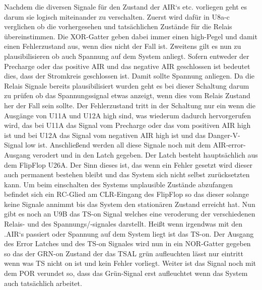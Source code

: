 Nachdem die diversen Signale für den Zustand der \ac{AIR}`s etc. vorliegen geht es darum sie logisch miteinander zu verschalten. Zuerst wird dafür in U8a-c verglichen ob die vorhergesehen und tatsächlichen Zustände für die Relais übereinstimmen. Die XOR-Gatter geben dabei immer einen high-Pegel und damit einen Fehlerzustand aus, wenn dies nicht der Fall ist. Zweitens gilt es nun zu plausibilisieren ob auch Spannung auf dem System anliegt. Sofern entweder der Precharge oder das positive \ac{AIR} und das negative \ac{AIR} geschlossen ist bedeutet dies, dass der Stromkreis geschlossen ist. Damit sollte Spannung anliegen. Da die Relais Signale bereits plausibilisiert wurden geht es bei dieser Schaltung darum zu prüfen ob das Spannungssignal etwas anzeigt, wenn dies vom Relais Zustand her der Fall sein sollte. Der Fehlerzustand tritt in der Schaltung nur ein wenn die Ausgänge von U11A und U12A high sind, was wiederum dadurch hervorgerufen wird, das bei U11A das Signal vom Precharge oder das vom positiven \ac{AIR} high ist und bei U12A das Signal vom negativen \ac{AIR} high ist und das Danger-V-Signal low ist. Anschließend werden all diese Signale noch mit dem \ac{AIR}-error-Ausgang verodert und in den Latch gegeben. Der Latch besteht hauptsächlich aus dem FlipFlop U26A. Der Sinn dieses ist, das wenn ein Fehler gesetzt wird dieser auch permanent bestehen bleibt und das System sich nicht selbst zurücksetzten kann. Um beim einschalten des Systems unplausible Zustände abzufangen befindet sich ein RC-Glied am CLR-Eingang des FlipFlop so das dieser solange keine Signale annimmt bis das System den stationären Zustand erreicht hat. Nun gibt es noch an U9B das \ac{TS}-on Signal welches eine veroderung der verschiedenen Relais- und des Spannungs/-signales darstellt. Heißt wenn irgendwas mit den .\ac{AIR}`s passiert oder Spannung auf dem System liegt ist das \ac{TS}-on. Der Ausgang des Error Latches und des \ac{TS}-on Signales wird nun in ein NOR-Gatter gegeben so das der GRN-on Zustand der das \ac{TSAL} grün aufleuchten lässt nur eintritt wenn was \ac{TS} nicht on ist und kein Fehler vorliegt. Weiter ist das Signal noch mit dem \ac{POR} verundet so, dass das Grün-Signal erst aufleuchtet wenn das System auch tatsächlich arbeitet.

